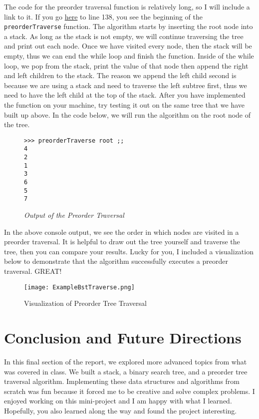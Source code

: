 \documentclass{article}
\begin{document}
\medskip\noindent
The code for the preorder traversal function is relatively long, so I will include a link to it. If you go  \href{https://github.com/michaelkulinich/Programming_Languages/blob/main/report/miniProject.lc}{here} to line 138, you see the beginning of the \texttt{preorderTraverse} function. The algorithm starts by inserting the root node into a stack. As long as the stack is not empty, we will continue traversing the tree and print out each node. Once we have visited every node, then the stack will be empty, thus we can end the while loop and finish the function. Inside of the while loop, we pop from the stack, print the value of that node then append the right and left children to the stack. The reason we append the left child second is because we are using a stack and need to traverse the left subtree first, thus we need to have the left child at the top of the stack. After you have implemented the function on your machine, try testing it out on the same tree that we have built up above. In the code below, we will run the algorithm on the root node of the tree.

\begin{figure}[H]
    \begin{lstlisting}
>>> preorderTraverse root ;;
4
2
1
3
6
5
7
    \end{lstlisting}
    \caption{\textit{Output of the Preorder Traversal}}
\end{figure}

\noindent
In the above console output, we see the order in which nodes are visited in a preorder traversal. It is helpful to draw out the tree yourself and traverse the tree, then you can compare your results. Lucky for you, I included a visualization below to demonstrate that the algorithm successfully executes a preorder traversal. GREAT! 

\begin{figure}[H]
    \centering
    \texttt{[image: ExampleBstTraverse.png]}
    \caption{Visualization of Preorder Tree Traversal}
    \label{fig:bst-traverse-visualization}
\end{figure}


\section{Conclusion and Future Directions}

\medskip\noindent
In this final section of the report, we explored more advanced topics from what was covered in class. We built a stack, a binary search tree, and a preorder tree traversal algorithm. Implementing these data structures and algorithms from scratch was fun because it forced me to be creative and solve complex problems. I enjoyed working on this mini-project and I am happy with what I learned. Hopefully, you also learned along the way and found the project interesting. 
\end{document}
